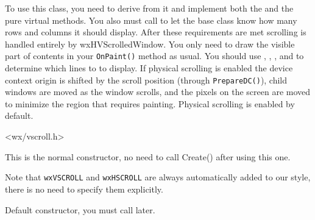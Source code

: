 To use this class, you need to derive from it and implement both the 
 and the 
 pure virtual
methods. You also must call 
 to let the
base class know how many rows and columns it should display. After these
requirements are met scrolling is handled entirely by wxHVScrolledWindow. You
only need to draw the visible part of contents in your {\tt OnPaint()} method
as usual. You should use 
, 
, 
, and 
 to
determine which lines to to display. If physical scrolling is enabled the
device context origin is shifted by the scroll position (through
{\tt PrepareDC()}), child windows are moved as the window scrolls, and the
pixels on the screen are moved to minimize the region that requires painting.
Physical scrolling is enabled by default.




<wx/vscroll.h>




\label{wxhvscrolledwindowctor}


This is the normal constructor, no need to call Create() after using this one.

Note that {\tt wxVSCROLL} and {\tt wxHSCROLL} are always automatically added to
our style, there is no need to specify them explicitly.


Default constructor, you must call 
later.


